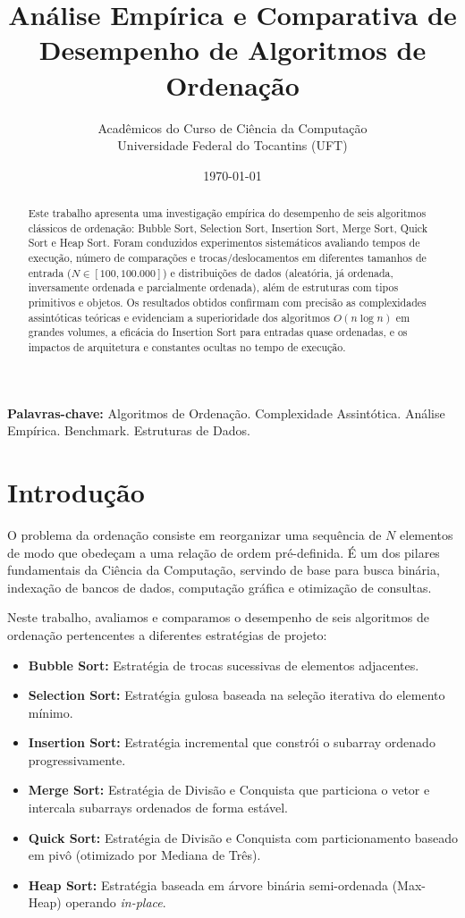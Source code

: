 \documentclass[12pt,a4paper]{article}
\title{\textbf{Análise Empírica e Comparativa de Desempenho de Algoritmos de Ordenação}}
\author{Acadêmicos do Curso de Ciência da Computação \\ Universidade Federal do Tocantins (UFT)}
\date{\today}
\begin{document}
\maketitle

\begin{abstract}
Este trabalho apresenta uma investigação empírica do desempenho de seis algoritmos clássicos de ordenação: Bubble Sort, Selection Sort, Insertion Sort, Merge Sort, Quick Sort e Heap Sort. Foram conduzidos experimentos sistemáticos avaliando tempos de execução, número de comparações e trocas/deslocamentos em diferentes tamanhos de entrada ($N \in [100, 100.000]$) e distribuições de dados (aleatória, já ordenada, inversamente ordenada e parcialmente ordenada), além de estruturas com tipos primitivos e objetos. Os resultados obtidos confirmam com precisão as complexidades assintóticas teóricas e evidenciam a superioridade dos algoritmos $O(n \log n)$ em grandes volumes, a eficácia do Insertion Sort para entradas quase ordenadas, e os impactos de arquitetura e constantes ocultas no tempo de execução.
\end{abstract}

\textbf{Palavras-chave:} Algoritmos de Ordenação. Complexidade Assintótica. Análise Empírica. Benchmark. Estruturas de Dados.

\section{Introdução}
O problema da ordenação consiste em reorganizar uma sequência de $N$ elementos de modo que obedeçam a uma relação de ordem pré-definida. É um dos pilares fundamentais da Ciência da Computação, servindo de base para busca binária, indexação de bancos de dados, computação gráfica e otimização de consultas.

Neste trabalho, avaliamos e comparamos o desempenho de seis algoritmos de ordenação pertencentes a diferentes estratégias de projeto:
\begin{itemize}
    \item \textbf{Bubble Sort:} Estratégia de trocas sucessivas de elementos adjacentes.
    \item \textbf{Selection Sort:} Estratégia gulosa baseada na seleção iterativa do elemento mínimo.
    \item \textbf{Insertion Sort:} Estratégia incremental que constrói o subarray ordenado progressivamente.
    \item \textbf{Merge Sort:} Estratégia de Divisão e Conquista que particiona o vetor e intercala subarrays ordenados de forma estável.
    \item \textbf{Quick Sort:} Estratégia de Divisão e Conquista com particionamento baseado em pivô (otimizado por Mediana de Três).
    \item \textbf{Heap Sort:} Estratégia baseada em árvore binária semi-ordenada (Max-Heap) operando \textit{in-place}.
\end{itemize}
\end{document}
